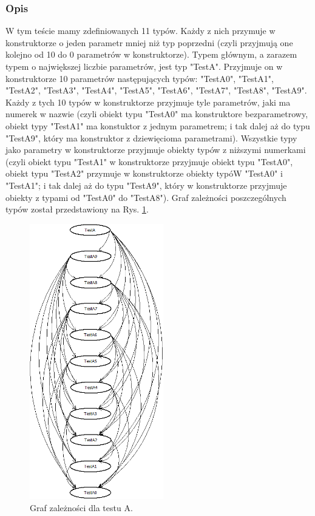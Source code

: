 \documentclass[12pt]{article}
\begin{document}
\subsubsection{Opis}
W tym teście mamy zdefiniowanych 11 typów. Każdy z nich przymuje w konstruktorze o jeden parametr mniej niż typ poprzedni (czyli przyjmują one kolejno od 10 do 0 parametrów w konstruktorze). Typem głównym, a zarazem typem o największej liczbie parametrów, jest typ "TestA". Przyjmuje on w konstruktorze 10 parametrów następujących typów: "TestA0", "TestA1", "TestA2", "TestA3", "TestA4", "TestA5", "TestA6", "TestA7", "TestA8", "TestA9". Każdy z tych 10 typów w konstruktorze przyjmuje tyle parametrów, jaki ma numerek w nazwie (czyli obiekt typu "TestA0" ma konstruktore bezparametrowy, obiekt typy "TestA1" ma konstuktor z jednym parametrem; i tak dalej aż do typu "TestA9", który ma konstruktor z dziewięcioma parametrami). Wszystkie typy jako parametry w konstruktorze przyjmuje obiekty typów z niższymi numerkami (czyli obiekt typu "TestA1" w konstruktorze przyjmuje obiekt typu "TestA0", obiekt typu "TestA2" przymuje w konstruktorze obiekty typóW "TestA0" i "TestA1";  i tak dalej aż do typu "TestA9", który w konstruktorze przyjmuje obiekty z typami od "TestA0" do "TestA8"). Graf zależności poszczególnych typów został przedstawiony na Rys. \ref{fig:testA}.
\begin{figure}[h]
	\begin{center}
  		\includegraphics[height=12cm]{TestA.png}
  		\caption{Graf zależności dla testu A.}
  		\label{fig:testA}
	\end{center}
\end{figure}\\
\end{document}
